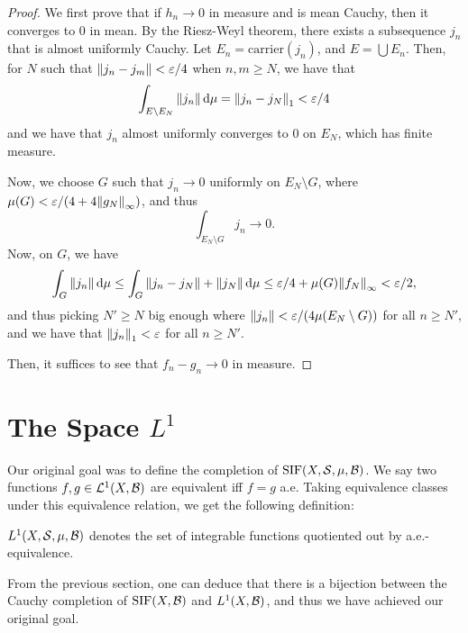 \begin{proof}
    We first prove that if $h_n \to 0$ in measure and is mean Cauchy, then it converges to $0$ in mean. By the Riesz-Weyl theorem, there exists a subsequence $j_n$ that is almost uniformly Cauchy. Let $E_n = \mathrm{carrier}(j_n)$, and $E = \bigcup E_n$. Then, for $N$ such that $\norm{j_n - j_m} < \varepsilon/4$ when $n, m \ge N$, we have that \[\int_{E \setminus E_N} \norm{j_n} \dd{\mu} = \norm{j_n - j_N}_1 < \varepsilon/4\] and we have that $j_n$ almost uniformly converges to $0$ on $E_N$, which has finite measure.

    Now, we choose $G$ such that $j_n \to 0$ uniformly on $E_N \setminus G$, where $\mu(G) < \varepsilon/(4 + 4\norm{g_N}_\infty)$, and thus \[\int_{E_N \setminus G} j_n \to 0.\] Now, on $G$, we have \[\int_G \norm{j_n} \dd{\mu} \le \int_G \norm{j_n - j_N} + \norm{j_N} \dd{\mu}\le \varepsilon/4 + \mu(G)\norm{f_N}_\infty < \varepsilon/2,\] and thus picking $N' \ge N$ big enough where $\norm{j_n} < \varepsilon/(4\mu(E_N \setminus G))$ for all $n \ge N'$, and we have that $\norm{j_n}_1 < \varepsilon$ for all $n \ge N'$.    

    Then, it suffices to see that $f_n - g_n \to 0$ in measure.
\end{proof}

\section{The Space $L^1$}

Our original goal was to define the completion of $\mathrm{SIF}(X, \mathcal S, \mu, \mathcal B)$. We say two functions $f, g \in \mathcal L^1(X, \mathcal B)$ are equivalent iff $f = g$ a.e. Taking equivalence classes under this equivalence relation, we get the following definition:

\begin{definition}
    $L^1(X, \mathcal S, \mu, \mathcal B)$ denotes the set of integrable functions quotiented out by a.e.-equivalence. 
\end{definition}

From the previous section, one can deduce that there is a bijection between the Cauchy completion of $\mathrm{SIF}(X, \mathcal B)$ and $L^1(X, \mathcal B)$, and thus we have achieved our original goal.